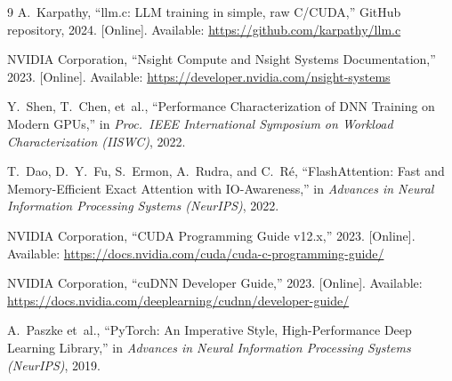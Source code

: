 \documentclass[10pt,twocolumn,letterpaper]{article}
\begin{document}
\begin{thebibliography}{9}
  A.~Karpathy, ``llm.c: LLM training in simple, raw C/CUDA,'' GitHub repository, 2024. [Online]. Available: \url{https://github.com/karpathy/llm.c}

  NVIDIA Corporation, ``Nsight Compute and Nsight Systems Documentation,'' 2023. [Online]. Available: \url{https://developer.nvidia.com/nsight-systems}

  Y.~Shen, T.~Chen, et~al., ``Performance Characterization of DNN Training on Modern GPUs,'' in \textit{Proc.\ IEEE International Symposium on Workload Characterization (IISWC)}, 2022.

  T.~Dao, D.~Y.~Fu, S.~Ermon, A.~Rudra, and C.~R\'e, ``FlashAttention: Fast and Memory-Efficient Exact Attention with IO-Awareness,'' in \textit{Advances in Neural Information Processing Systems (NeurIPS)}, 2022.

  NVIDIA Corporation, ``CUDA Programming Guide v12.x,'' 2023. [Online]. Available: \url{https://docs.nvidia.com/cuda/cuda-c-programming-guide/}

  NVIDIA Corporation, ``cuDNN Developer Guide,'' 2023. [Online]. Available: \url{https://docs.nvidia.com/deeplearning/cudnn/developer-guide/}

  A.~Paszke et~al., ``PyTorch: An Imperative Style, High-Performance Deep Learning Library,'' in \textit{Advances in Neural Information Processing Systems (NeurIPS)}, 2019.
\end{thebibliography}
\end{document}
